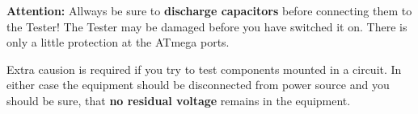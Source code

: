 \vspace{1cm}
\textbf{\Large {Attention:}} Allways be sure to \textbf {discharge capacitors} before connecting them to the Tester!
The Tester may be damaged before you have switched it on. There is only a little protection at the ATmega ports.

Extra causion is required if you try to test components mounted in a circuit.
In either case the equipment should be disconnected from power source and you should be sure,
that \textbf {no residual voltage} remains in the equipment.


